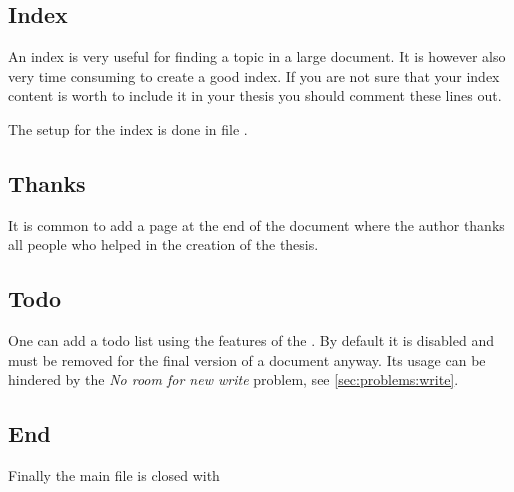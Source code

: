 \subsection{Index}
\label{sec:document:index}

An index is very useful for finding a topic in a large document. It is however also very time consuming to create a good index. If you are not sure that your index content is worth to include it in your thesis you should comment these lines out.

The setup for the index is done in file .


\subsection{Thanks}
\label{sec:document:thanks}

It is common to add a page at the end of the document where the author thanks all people who helped in the creation of the thesis. 


\subsection{Todo}
\label{sec:document:todo}

One can add a todo list using the features of the . 
By default it is disabled and must be removed for the final version of a document anyway. Its usage can be hindered by the \textit{No room for new write} problem, see \cref{sec:problems:write}.

\subsection{End}
\label{sec:document:end}

Finally the main file is closed with 

